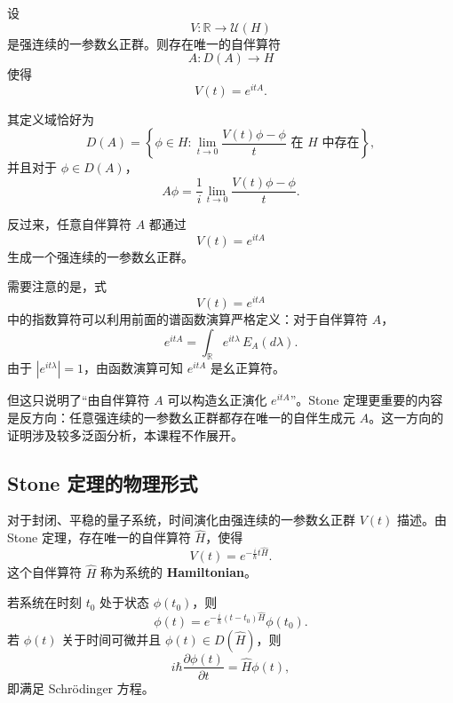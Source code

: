 \documentclass[UTF8,a4paper,11pt,openany]{ctexbook}
\begin{document}
\begin{proposition}[Stone 定理]
设
\[
V:\mathbb R\to\mathcal U(H)
\]
是强连续的一参数幺正群。则存在唯一的自伴算符
\[
A:D(A)\to H
\]
使得
\begin{equation}
    V(t)=e^{itA}.
\end{equation}

其定义域恰好为
\begin{equation}
    D(A)
    =
    \left\{
    \phi\in H:
    \lim_{t\to0}
    \frac{V(t)\phi-\phi}{t}
    \text{ 在 }H\text{ 中存在}
    \right\},
\end{equation}
并且对于 $\phi\in D(A)$，
\begin{equation}
    A\phi
    =
    \frac{1}{i}
    \lim_{t\to0}
    \frac{V(t)\phi-\phi}{t}.
\end{equation}

反过来，任意自伴算符 $A$ 都通过
\[
V(t)=e^{itA}
\]
生成一个强连续的一参数幺正群。
\end{proposition}

需要注意的是，式
\[
V(t)=e^{itA}
\]
中的指数算符可以利用前面的谱函数演算严格定义：对于自伴算符 $A$，
\[
e^{itA}
=
\int_{\mathbb R}e^{it\lambda}\,E_A(d\lambda).
\]
由于 $|e^{it\lambda}|=1$，由函数演算可知 $e^{itA}$ 是幺正算符。

但这只说明了“由自伴算符 $A$ 可以构造幺正演化 $e^{itA}$”。Stone 定理更重要的内容是反方向：任意强连续的一参数幺正群都存在唯一的自伴生成元 $A$。这一方向的证明涉及较多泛函分析，本课程不作展开。

\subsection{Stone 定理的物理形式}
\begin{proposition}
对于封闭、平稳的量子系统，时间演化由强连续的一参数幺正群 $V(t)$ 描述。由 Stone 定理，存在唯一的自伴算符 $\hat H$，使得
\begin{equation}
    V(t)=e^{-\frac{i}{\hbar}t\hat H}.
\end{equation}
这个自伴算符 $\hat H$ 称为系统的 \textbf{Hamiltonian}。

若系统在时刻 $t_0$ 处于状态 $\phi(t_0)$，则
\begin{equation}
    \phi(t)
    =
    e^{-\frac{i}{\hbar}(t-t_0)\hat H}\phi(t_0).
\end{equation}
若 $\phi(t)$ 关于时间可微并且 $\phi(t)\in D(\hat H)$，则
\begin{equation}
    i\hbar\frac{\partial\phi(t)}{\partial t}
    =
    \hat H\phi(t),
\end{equation}
即满足 Schrödinger 方程。
\end{proposition}
\end{document}
